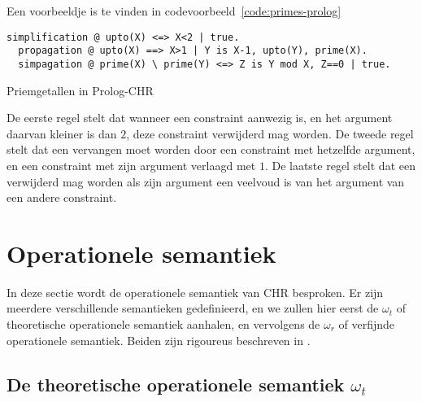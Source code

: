 Een voorbeeldje is te vinden in codevoorbeeld~\ref{code:primes-prolog}
\begin{exCode}[bp]
\begin{Verbatim}[frame=single]
  simplification @ upto(X) <=> X<2 | true.
  propagation @ upto(X) ==> X>1 | Y is X-1, upto(Y), prime(X).
  simpagation @ prime(X) \ prime(Y) <=> Z is Y mod X, Z==0 | true.
\end{Verbatim}
\caption{Priemgetallen in Prolog-CHR}
\label{code:primes-prolog}
\end{exCode}
De eerste regel stelt dat wanneer een  constraint aanwezig is, en het argument daarvan kleiner is dan $2$, deze constraint verwijderd mag worden. De tweede regel stelt dat een  vervangen moet worden door een  constraint met hetzelfde argument, en een  constraint met zijn argument verlaagd met $1$. De laatste regel stelt dat een  verwijderd mag worden als zijn argument een veelvoud is van het argument van een andere  constraint.

\section{Operationele semantiek}

In deze sectie wordt de operationele semantiek van CHR besproken. Er zijn meerdere verschillende semantieken gedefinieerd, en we zullen hier eerst de $\omega_t$ of theoretische operationele semantiek aanhalen, en vervolgens de $\omega_r$ of verfijnde operationele semantiek. Beiden zijn rigoureus beschreven in \cite{refined}.

\subsection{De theoretische operationele semantiek $\omega_t$} \label{sec:omegat}

